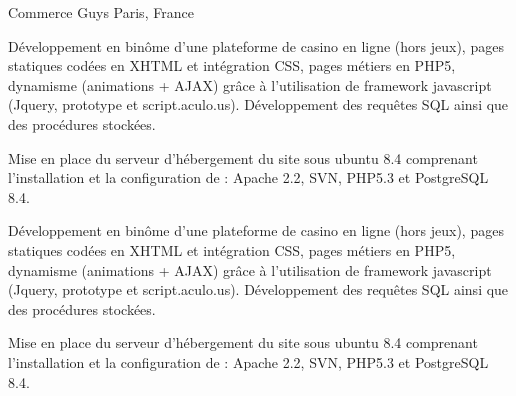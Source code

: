 \cventry
{} %
{Commerce Guys} %
{Paris, France} %
{} %
{
\begin{cvsubentries}
    {
    \begin{cvitems} %
        \item
        {
        Développement en binôme d’une plateforme de casino en ligne (hors jeux),
        pages statiques codées en XHTML et intégration CSS, pages métiers en PHP5, dynamisme
        (animations + AJAX) grâce à l’utilisation de framework javascript (Jquery, prototype et script.aculo.us).
        Développement des requêtes SQL ainsi que des procédures stockées.
        }
        \item
        {
        Mise en place du serveur d'hébergement du site sous ubuntu 8.4 comprenant l'installation et la
        configuration de : Apache 2.2, SVN, PHP5.3 et PostgreSQL 8.4.
        }
    \end{cvitems}
    }
    {
    \begin{cvitems} %
        \item
        {
        Développement en binôme d’une plateforme de casino en ligne (hors jeux),
        pages statiques codées en XHTML et intégration CSS, pages métiers en PHP5, dynamisme
        (animations + AJAX) grâce à l’utilisation de framework javascript (Jquery, prototype et script.aculo.us).
        Développement des requêtes SQL ainsi que des procédures stockées.
        }
        \item
        {
        Mise en place du serveur d'hébergement du site sous ubuntu 8.4 comprenant l'installation et la
        configuration de : Apache 2.2, SVN, PHP5.3 et PostgreSQL 8.4.
        }
    \end{cvitems}
    }
\end{cvsubentries}
}